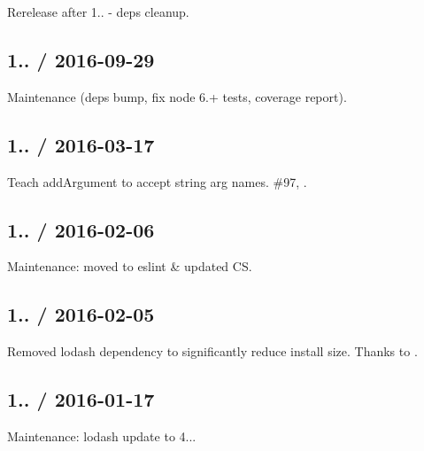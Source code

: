 
\begin{DoxyItemize}
\item Rerelease after 1.. -\/ deps cleanup.
\end{DoxyItemize}

\subsection*{1.. / 2016-\/09-\/29 }


\begin{DoxyItemize}
\item Maintenance (deps bump, fix node 6.+ tests, coverage report).
\end{DoxyItemize}

\subsection*{1.. / 2016-\/03-\/17 }


\begin{DoxyItemize}
\item Teach {\ttfamily add\+Argument} to accept string arg names. \#97, .
\end{DoxyItemize}

\subsection*{1.. / 2016-\/02-\/06 }


\begin{DoxyItemize}
\item Maintenance\+: moved to eslint \& updated CS.
\end{DoxyItemize}

\subsection*{1.. / 2016-\/02-\/05 }


\begin{DoxyItemize}
\item Removed lodash dependency to significantly reduce install size. Thanks to .
\end{DoxyItemize}

\subsection*{1.. / 2016-\/01-\/17 }


\begin{DoxyItemize}
\item Maintenance\+: lodash update to 4...
\end{DoxyItemize}

